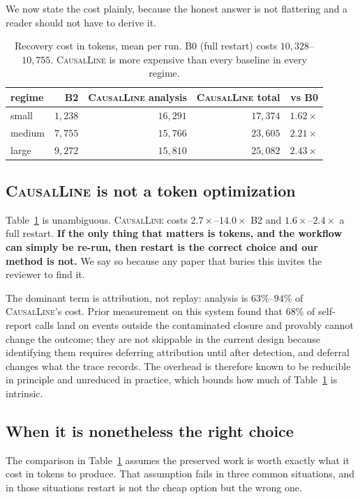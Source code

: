 \documentclass[10pt,twocolumn]{article}
\newcommand{\sys}{\textsc{CausalLine}}
\newcommand{\bzero}{\textsf{B0}}
\newcommand{\btwo}{\textsf{B2}}
\begin{document}
We now state the cost plainly, because the honest answer is not flattering and
a reader should not have to derive it.

\begin{table}[t]
\centering
\small
\begin{tabular}{lrrrr}
\toprule
regime & \btwo{} & \sys{} analysis & \sys{} total & vs \bzero{} \\
\midrule
small  & $1{,}238$ & $16{,}291$ & $17{,}374$ & $1.62\times$ \\
medium & $7{,}755$ & $15{,}766$ & $23{,}605$ & $2.21\times$ \\
large  & $9{,}272$ & $15{,}810$ & $25{,}082$ & $2.43\times$ \\
\bottomrule
\end{tabular}
\caption{Recovery cost in tokens, mean per run. \bzero{} (full restart) costs
$10{,}328$--$10{,}755$. \sys{} is more expensive than every baseline in every
regime.}
\label{tab:cost}
\end{table}

\subsection{\sys{} is not a token optimization}

Table~\ref{tab:cost} is unambiguous. \sys{} costs $2.7\times$--$14.0\times$
\btwo{} and $1.6\times$--$2.4\times$ a full restart. \textbf{If the only thing
that matters is tokens, and the workflow can simply be re-run, then restart is
the correct choice and our method is not.} We say so because any paper that
buries this invites the reviewer to find it.

The dominant term is attribution, not replay: analysis is $63\%$--$94\%$ of
\sys{}'s cost. Prior measurement on this system found that $68\%$ of
self-report calls land on events outside the contaminated closure and provably
cannot change the outcome; they are not skippable in the current design
because identifying them requires deferring attribution until after detection,
and deferral changes what the trace records. The overhead is therefore known
to be reducible in principle and unreduced in practice, which bounds how much
of Table~\ref{tab:cost} is intrinsic.

\subsection{When it is nonetheless the right choice}

The comparison in Table~\ref{tab:cost} assumes the preserved work is worth
exactly what it cost in tokens to produce. That assumption fails in three
common situations, and in those situations restart is not the cheap option but
the wrong one.
\end{document}
